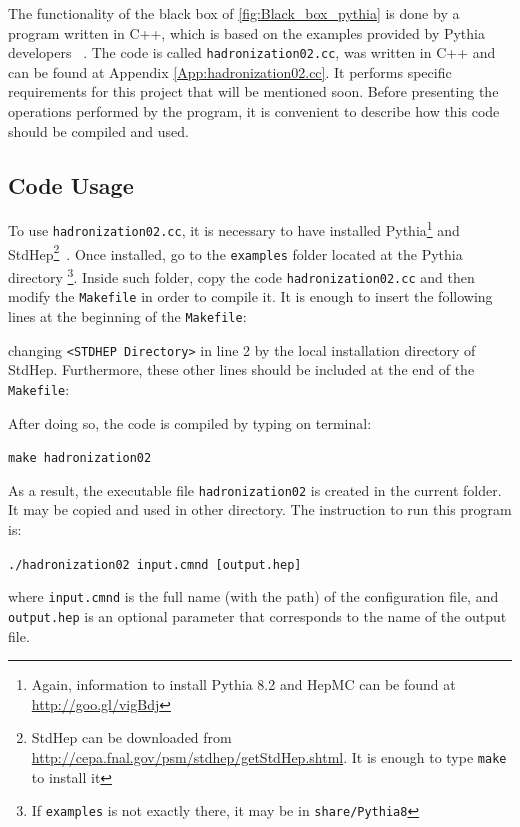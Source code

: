 \documentclass[12pt, oneside]{book}              %
\begin{document}
The functionality of the black box of \ref{fig:Black_box_pythia} is done by
a program written in C++, which is based on the examples provided by Pythia 
developers ~\cite{Sjostrand:2006za}. The code is called \texttt{hadronization02.cc}, 
was written in C++ and can be found at Appendix \ref{App:hadronization02.cc}.
It performs specific requirements for this project that will be mentioned soon. 
Before presenting the operations performed by the program, it is convenient 
to describe how this code should be compiled and used. 

\subsection{Code Usage}\label{sub:Code_usage}

To use \texttt{hadronization02.cc}, it is necessary to have installed 
Pythia\footnote{Again, information to install Pythia 8.2 and HepMC can be 
found at \url{http://goo.gl/vigBdj}} and StdHep\footnote{StdHep can be 
downloaded from \url{http://cepa.fnal.gov/psm/stdhep/getStdHep.shtml}.
It is enough to type \texttt{make} to install it}~\cite{Garren-StdHep}.
Once installed, go to the \texttt{examples} folder located at the Pythia
directory \footnote{If \texttt{examples} is not exactly there, it may 
be in \texttt{share/Pythia8}}.
Inside such folder, copy the code \texttt{hadronization02.cc} and then 
modify the \texttt{Makefile} in order to compile it. It is enough to insert
the following lines at the beginning of the \texttt{Makefile}:



\noindent changing \texttt{<STDHEP Directory>} in line 2 by the local
installation directory of StdHep. Furthermore, these other lines should
be included at the end of the \texttt{Makefile}:



After doing so, the code is compiled by typing on terminal:

\texttt{make hadronization02}

As a result, the executable file \texttt{hadronization02} is created in 
the current folder. It may be copied and used in other directory.
The instruction to run this program is:

\texttt{./hadronization02 input.cmnd [output.hep]}

\noindent where \texttt{input.cmnd} is the full name (with the path) of 
the configuration file, and \texttt{output.hep} is an optional parameter
that corresponds to the name of the output file.
\end{document}
